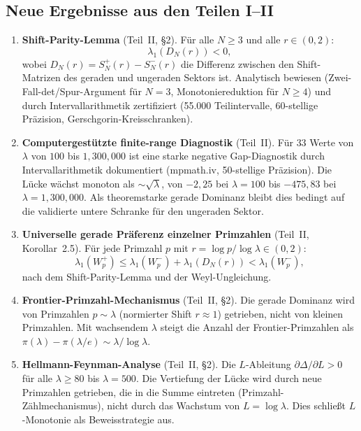 \documentclass[12pt,a4paper]{article}
\theoremstyle{definition}
\theoremstyle{remark}
\begin{document}
\subsection{Neue Ergebnisse aus den Teilen I--II}

\begin{enumerate}[label=\textbf{N\arabic*},leftmargin=3em]
  \item \textbf{Shift-Parity-Lemma} (Teil~II, \S2). Für alle $N \geq 3$ und alle $r \in (0,2)$:
  \[ \lambda_1(D_N(r)) < 0, \]
  wobei $D_N(r) = S_N^+(r) - S_N^-(r)$ die Differenz zwischen den Shift-Matrizen des geraden und ungeraden Sektors ist. Analytisch bewiesen (Zwei-Fall-det/Spur-Argument für $N=3$, Monotoniereduktion für $N \geq 4$) und durch Intervallarithmetik zertifiziert (55.000 Teilintervalle, 60-stellige Präzision, Gerschgorin-Kreisschranken).

  \item \textbf{Computergestützte finite-range Diagnostik} (Teil~II). Für $33$ Werte von $\lambda$ von $100$ bis $1{,}300{,}000$ ist eine starke negative Gap-Diagnostik durch Intervallarithmetik dokumentiert (mpmath.iv, 50-stellige Präzision). Die Lücke wächst monoton als $\sim\!\sqrt{\lambda}$, von $-2{,}25$ bei $\lambda = 100$ bis $-475{,}83$ bei $\lambda = 1{,}300{,}000$. Als theoremstarke gerade Dominanz bleibt dies bedingt auf die validierte untere Schranke für den ungeraden Sektor.

  \item \textbf{Universelle gerade Präferenz einzelner Primzahlen} (Teil~II, Korollar~2.5). Für jede Primzahl $p$ mit $r = \log p / \log\lambda \in (0,2)$:
  \[ \lambda_1(W_p^+) \leq \lambda_1(W_p^-) + \lambda_1(D_N(r)) < \lambda_1(W_p^-), \]
  nach dem Shift-Parity-Lemma und der Weyl-Ungleichung.

  \item \textbf{Frontier-Primzahl-Mechanismus} (Teil~II, \S2). Die gerade Dominanz wird von Primzahlen $p \sim \lambda$ (normierter Shift $r \approx 1$) getrieben, nicht von kleinen Primzahlen. Mit wachsendem $\lambda$ steigt die Anzahl der Frontier-Primzahlen als $\pi(\lambda) - \pi(\lambda/e) \sim \lambda/\log\lambda$.

  \item \textbf{Hellmann-Feynman-Analyse} (Teil~II, \S2). Die $L$-Ableitung $\partial\Delta/\partial L > 0$ für alle $\lambda \geq 80$ bis $\lambda = 500$. Die Vertiefung der Lücke wird durch neue Primzahlen getrieben, die in die Summe eintreten (Primzahl-Zählmechanismus), nicht durch das Wachstum von $L = \log\lambda$. Dies schließt $L$-Monotonie als Beweisstrategie aus.


\end{enumerate}
\end{document}
